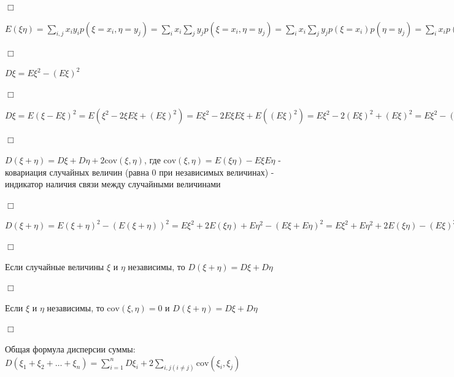 \documentclass[12pt]{article}
\begin{document}
    \begin{MyProof}
        $\Box$

        $E(\xi\eta) = \sum_{i, j} x_i y_i p(\xi = x_i, \eta = y_j) = \sum_i x_i \sum_j y_j p(\xi = x_i, \eta = y_j) =
        \sum_i x_i \sum_j y_j p(\xi = x_i) p(\eta = y_j) = \sum_i x_i p(\xi = x_i) \sum_j y_j p(\eta = y_j) = E\xi \cdot E\eta$

        $\Box$
    \end{MyProof}

    \begin{MyTheorem}
         $D\xi = E\xi^2 - (E\xi)^2$
    \end{MyTheorem}

    \begin{MyProof}
        $\Box$

        $D\xi = E(\xi - E\xi)^2 = E(\xi^2 - 2\xi E\xi + (E\xi)^2) = E\xi^2 - 2E\xi E\xi + E((E\xi)^2) =
        E\xi^2 - 2(E\xi)^2 + (E\xi)^2 = E\xi^2 - (E\xi)^2$

        $\Box$
    \end{MyProof}

    \Def $D(\xi + \eta) = D\xi + D\eta + 2\mathrm{cov} (\xi, \eta)$,
    где $\mathrm{cov}(\xi, \eta) = E(\xi\eta) - E\xi E\eta$ - ковариация случайных величин (равна 0 при независимых величинах) - индикатор наличия связи между случайными величинами

    \begin{MyProof}
        $\Box$

    $D(\xi + \eta) = E(\xi + \eta)^2 - (E(\xi + \eta))^2 = E\xi^2 + 2E(\xi \eta) + E\eta^2 - (E\xi + E\eta)^2 =
    E\xi^2 + E\eta^2 + 2E(\xi\eta) - (E\xi)^2 - (E\eta)^2 - 2E\xi E\eta = D\xi + D\eta + 2\mathrm{cov}(\xi, \eta)$

        $\Box$
    \end{MyProof}


    \begin{MyTheorem}
         Если случайные величины $\xi$ и $\eta$ независимы, то $D(\xi + \eta) = D\xi + D\eta$
    \end{MyTheorem}

    \begin{MyProof}
        $\Box$

        Если $\xi$ и $\eta$ независимы, то $\mathrm{cov}(\xi, \eta) = 0$ и $D(\xi + \eta) = D\xi + D\eta$

        $\Box$
    \end{MyProof}

    \begin{MyTheorem}
         Общая формула дисперсии суммы: $D(\xi_1 + \xi_2 + \dots + \xi_n) = \sum_{i = 1}^n D \xi_i + 2\sum_{i, j (i \neq j)} \mathrm{cov} (\xi_i, \xi_j)$
    \end{MyTheorem}
\end{document}
